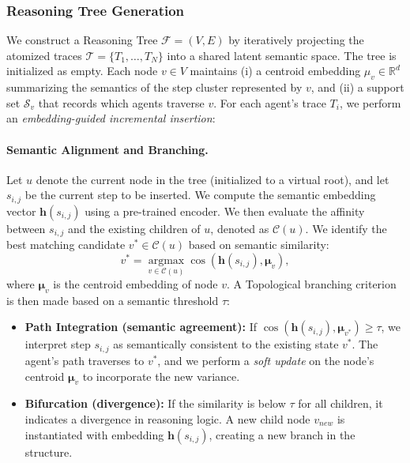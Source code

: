 \documentclass{article}
\theoremstyle{plain}
\theoremstyle{definition}
\theoremstyle{remark}
\begin{document}
\subsubsection{Reasoning Tree Generation}
\label{sec:tree_gen}
We construct a Reasoning Tree $\mathcal{F} = (V, E)$ by iteratively projecting the atomized traces $\mathcal{T} = \{T_1, \dots, T_N\}$ into a shared latent semantic space. The tree is initialized as empty. Each node $v\in V$ maintains (i) a centroid embedding ${\mu}_v \in \mathbb{R}^d$ summarizing the semantics of the step cluster represented by $v$, and (ii) a support set $\mathcal{S}_v$ that records which agents traverse $v$. For each agent's trace $T_i$, we perform an \textit{embedding-guided incremental insertion}:

\paragraph{Semantic Alignment and Branching.}
Let $u$ denote the current node in the tree (initialized to a virtual root), and let $s_{i,j}$ be the current step to be inserted. We compute the semantic embedding vector $\mathbf{h}(s_{i,j})$ using a pre-trained encoder. We then evaluate the affinity between $s_{i,j}$ and the existing children of $u$, denoted as $\mathcal{C}(u)$.
We identify the best matching candidate $v^* \in \mathcal{C}(u)$ based on semantic similarity:
\begin{equation}
    v^* = \operatorname*{argmax}_{v \in \mathcal{C}(u)} \cos(\mathbf{h}(s_{i,j}), \mathbf{\mu}_v),
\end{equation}
where $\mathbf{\mu}_v$ is the centroid embedding of node $v$. A Topological branching criterion is then made based on a semantic threshold $\tau$:
\begin{itemize}[nosep,noitemsep]
    \item \textbf{Path Integration (semantic agreement):} If $\cos(\mathbf{h}(s_{i,j}), \mathbf{\mu}_{v^*}) \geq \tau$, we interpret step $s_{i,j}$ as semantically consistent to the existing state $v^*$. The agent's path traverses to $v^*$, and we perform a \textit{soft update} on the node's centroid $\mathbf{\mu}_v$ to incorporate the new variance.
    \item \textbf{Bifurcation (divergence):} If the similarity is below $\tau$ for all children, it indicates a divergence in reasoning logic. A new child node $v_{new}$ is instantiated with embedding $\mathbf{h}(s_{i,j})$, creating a new branch in the structure.
\end{itemize}
\end{document}
